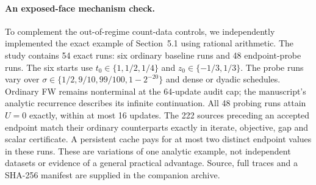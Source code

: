 \paragraph{An exposed-face mechanism check.}
To complement the out-of-regime count-data controls, we independently
implemented the exact example of Section~5.1 using rational arithmetic.
The study contains 54 exact runs: six ordinary baseline runs and 48
endpoint-probe runs. The six starts use
$t_0\in\{1,1/2,1/4\}$ and $z_0\in\{-1/3,1/3\}$. The probe runs
vary over $\sigma\in\{1/2,9/10,99/100,1-2^{-20}\}$ and dense or
dyadic schedules. Ordinary FW remains nonterminal at the
64-update audit cap; the manuscript's analytic recurrence describes
its infinite continuation. All 48 probing runs attain $U=0$ exactly,
within at most 16 updates. The 222 sources preceding an accepted
endpoint match their ordinary counterparts exactly in iterate,
objective, gap and scalar certificate. A persistent cache pays for at
most two distinct endpoint values in these runs. These are variations
of one analytic example, not independent datasets or evidence of a
general practical advantage. Source, full traces and a SHA-256 manifest
are supplied in the companion archive.
